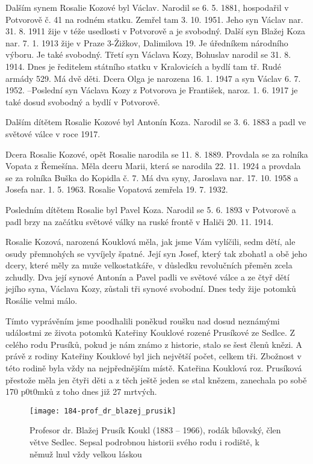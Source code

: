 \documentclass[../dejiny-rodu-prusiku.tex]{subfiles}
\begin{document}
Dalším synem Rosalie Kozové byl Václav. Narodil se 6. 5. 1881, hospodařil v Potvorově č. 41 na rodném statku. Zemřel tam 3. 10. 1951. Jeho syn Václav nar. 31. 8. 1911 žije v téže usedlosti v Potvorově a je svobodný. Další syn Blažej Koza nar. 7. 1. 1913 žije v Praze 3-Žižkov, Dali­milova 19. Je úředníkem národního výboru. Je také svobodný. Třetí syn Václava Kozy, Bohuslav narodil se 31. 8. 1914. Dnes je ředitelem státního statku v Kralovicích a bydlí tam tř. Rudé armády 529. Má dvě děti. Dcera Olga je narozena 16. 1. 1947 a syn Václav 6. 7. 1952. –Poslední syn Václava Kozy z Potvorova je František, naroz. 1. 6. 1917 je také dosud svobodný a bydlí v Potvorově.

Dalším dítětem Rosalie Kozové byl Antonín Koza. Narodil se 3. 6. 1883 a padl ve světové válce v roce 1917.

Dcera Rosalie Kozové, opět Rosalie narodila se 11. 8. 1889. Provdala se za rolníka Vopata z Řemešína. Měla dceru Marii, která se narodila 22. 11. 1924 a provdala se za rolníka Buška do Kopidla č. 7. Má dva syny, Jaroslava nar. 17. 10. 1958 a Josefa nar. 1. 5. 1963. Rosalie Vopatová zemřela 19. 7. 1932.

Posledním dítětem Rosalie byl Pavel Koza. Narodil se 5. 6. 1893 v Potvorově a padl brzy na začátku světové války na ruské frontě v Haliči 20. 11. 1914.

Rosalie Kozová, narozená Kouklová měla, jak jsme Vám vylíčili, sedm dětí, ale osudy přemnohých se vyvíjely špatné. Její syn Josef, který tak zbohatl a obě jeho dcery, které měly za muže velkostatkáře, v důsled­ku revolučních přeměn zcela zchudly. Dva její synové Antonín a Pavel padli ve světové válce a ze čtyř dětí jejího syna, Václava Kozy,  zůstali tři synové svo­bodní. Dnes tedy žije potomků Rosálie velmi málo.

Tímto vyprávěním jsme poodhalili poněkud roušku nad dosud neznámými událostmi ze života potomků Kateřiny Kouklové rozené Prusíkové ze Sedlce. Z celého rodu Prusíků, pokud je nám známo z historie, stalo se šest členů knězi. A právě z rodiny Kateřiny Kouklové byl jich největší počet, celkem tři. Zbožnost v této rodině byla vždy na nejpřednějším místě. Kateřina Kouklová roz. Prusíková přestože měla jen čtyři děti a z těch ještě jeden se stal knězem, zanechala po sobě 170 p0t0mků z toho dnes již 27 mrtvých.


\begin{figure}
\centering
\texttt{[image: 184-prof\_dr\_blazej\_prusik]}
\caption{Profesor dr. Blažej Prusík Koukl (1883 – 1966), rodák bílovský, člen větve Sedlec. Sepsal podrobnou historii svého rodu i rodiště, k němuž lnul vždy velkou láskou}
\label{fig:184-prof_dr_blazej_prusik}
\end{figure}
\end{document}
